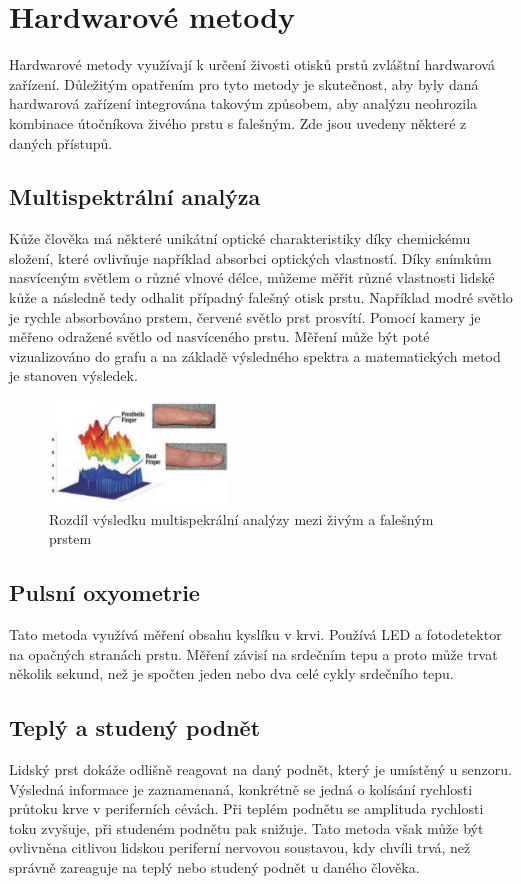 \section{Hardwarové metody}
Hardwarové metody využívají k určení živosti otisků prstů zvláštní hardwarová zařízení. Důležitým opatřením pro tyto metody je skutečnost, aby byly daná hardwarová zařízení integrována takovým způsobem, aby analýzu neohrozila kombinace útočníkova živého prstu s falešným. Zde jsou uvedeny některé z daných přístupů.
\subsection{Multispektrální analýza}
Kůže člověka má některé unikátní optické charakteristiky díky chemickému složení, které ovlivňuje například absorbci optických vlastností. Díky snímkům nasvíceným světlem o různé vlnové délce, můžeme měřit různé vlastnosti lidské kůže a následně tedy odhalit případný falešný otisk prstu. Například modré světlo je rychle absorbováno prstem, červené světlo prst prosvítí. Pomocí kamery je měřeno odražené světlo od nasvíceného prstu. Měření může být poté vizualizováno do grafu a na základě výsledného spektra a matematických metod je stanoven výsledek. \cite{AdvancedBiometricsTechnologies2011}

\begin{figure}[!htbp]
    \centering
    \includegraphics[width=180px]{obrazky-figures/multispectralAnalysis.PNG}
    \caption{Rozdíl výsledku multispekrální analýzy mezi živým a falešným prstem \cite{AdvancedBiometricsTechnologies2011}}
\end{figure}

\subsection{Pulsní oxyometrie}
Tato metoda využívá měření obsahu kyslíku v krvi. Používá LED a fotodetektor na opačných stranách prstu. Měření závisí na srdečním tepu a proto může trvat několik sekund, než je spočten jeden nebo dva celé cykly srdečního tepu. \cite{BiometricsEncyclopedia2009}
\subsection{Teplý a studený podnět}
Lidský prst dokáže odlišně reagovat na daný podnět, který je umístěný u senzoru. Výsledná informace je zaznamenaná, konkrétně se jedná o kolísání rychlosti průtoku krve v periferních cévách. Při teplém podnětu se amplituda rychlosti toku zvyšuje, při studeném podnětu pak snižuje. Tato metoda však může být ovlivněna citlivou lidskou periferní nervovou soustavou, kdy chvíli trvá, než správně zareaguje na teplý nebo studený podnět u daného člověka. \cite{AdvancedBiometricsTechnologies2011}
